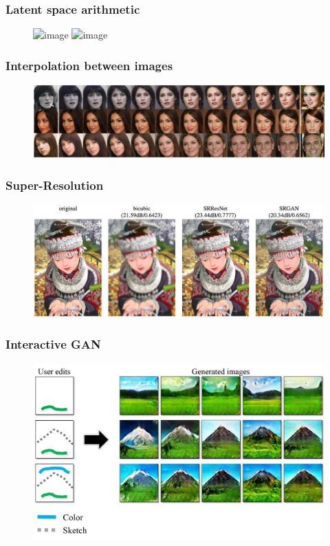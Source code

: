 \documentclass{Bredelebeamer}
\begin{document}
\begin{frame}
	\frametitle{Latent space arithmetic}
	\begin{figure}[h!]
	\centering
	\includegraphics<1>[width=\textwidth]{vector_space_arithmetic.png}
	\includegraphics<2>[width=0.9\textwidth]{vector_space_arithmetic_2.png}
	\end{figure}
\end{frame}
\begin{frame}
	\frametitle{Interpolation between images}
	\begin{figure}[h!]
	\centering
	\includegraphics[width=\textwidth]{began_interpolation.png}
	\end{figure}
\end{frame}
\begin{frame}
	\frametitle{Super-Resolution}
	\begin{figure}[h!]
	\centering
	\includegraphics[width=\textwidth]{superresolution.jpg}
	\end{figure}
\end{frame}
\begin{frame}
	\frametitle{Interactive GAN}
	\begin{figure}[h!]
	\centering
	\includegraphics[width=\textwidth]{interactive_gan.jpg}
	\end{figure}
	\href{{https://www.youtube.com/watch?v=9c4z6YsBGQ0}}{}
\end{frame}
\end{document}
